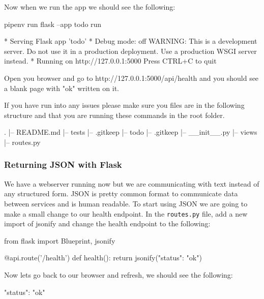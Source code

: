 \documentclass{csse4400}
\begin{document}
Now when we run the app we should see the following:

\begin{code}[language=bash]{}
pipenv run flask --app todo run

* Serving Flask app 'todo'
* Debug mode: off
WARNING: This is a development server. Do not use it in a production deployment. Use a production WSGI server instead.
* Running on http://127.0.0.1:5000
Press CTRL+C to quit
\end{code}

Open you browser and go to http://127.0.0.1:5000/api/health and you should see a blank page with "ok" written on it.

If you have run into any issues please make sure you files are in the following structure and that you are running these commands in the root folder.

\begin{code}[language=bash]{}
  .
  |-- README.md
  |-- tests
      |-- .gitkeep
  |-- todo
      |-- .gitkeep
      |-- __init__.py
      |-- views
          |-- routes.py
\end{code}

\subsubsection{Returning JSON with Flask}

We have a webserver running now but we are communicating with text instead of any structured form. JSON is pretty common format to communicate data between services and is human readable. To start using JSON we are going to make a small change to our health endpoint. In the \texttt{routes.py} file, add a new import of jsonify and change the health endpoint to the following:

\begin{code}[language=python]{}
from flask import Blueprint, jsonify
\end{code}

\begin{code}[language=python]{}
@api.route('/health')
def health():
    return jsonify({"status": "ok"})
\end{code}

Now lets go back to our browser and refresh, we should see the following:

\begin{code}[language=json,numbers=none]{}
{
  "status": "ok"
}
\end{code}
\end{document}
